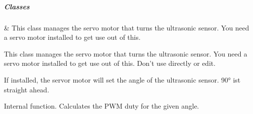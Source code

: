 \documentclass[letterpaper,10pt,english]{sphinxmanual}
\begin{document}
\subparagraph{Classes}
\label{\detokenize{autoapi/robotlibrary/servo/index:classes}}

\begin{savenotes}\sphinxattablestart
\sphinxthistablewithglobalstyle
\sphinxthistablewithnovlinesstyle
\centering
\begin{tabulary}{\linewidth}[t]{}
\sphinxtoprule
\sphinxtableatstartofbodyhook
\sphinxAtStartPar
{\hyperref[\detokenize{autoapi/robotlibrary/servo/index:robotlibrary.servo.Servo}]{}}
&
\sphinxAtStartPar
This class manages the servo motor that turns the ultrasonic sensor. You need a servo motor installed to get use out of this.
\\
\sphinxbottomrule
\end{tabulary}
\sphinxtableafterendhook\par
\sphinxattableend\end{savenotes}

\begin{fulllineitems}
\label{\detokenize{autoapi/robotlibrary/servo/index:robotlibrary.servo.Servo}}
\pysigstartsignatures
{}
\pysigstopsignatures
\sphinxAtStartPar
This class manages the servo motor that turns the ultrasonic sensor. You need a servo motor installed to get use out of this.
Don’t use directly or edit.

\begin{fulllineitems}
\label{\detokenize{autoapi/robotlibrary/servo/index:robotlibrary.servo.Servo.set_angle}}
\pysigstartsignatures
{}
\pysigstopsignatures
\sphinxAtStartPar
If installed, the servor motor will set the angle of the ultrasonic sensor. 90° ist straight ahead.

\end{fulllineitems}


\begin{fulllineitems}
\label{\detokenize{autoapi/robotlibrary/servo/index:robotlibrary.servo.Servo._get_duty}}
\pysigstartsignatures
{}
\pysigstopsignatures
\sphinxAtStartPar
Internal function. Calculates the PWM duty for the given angle.

\end{fulllineitems}


\end{fulllineitems}
\end{document}
